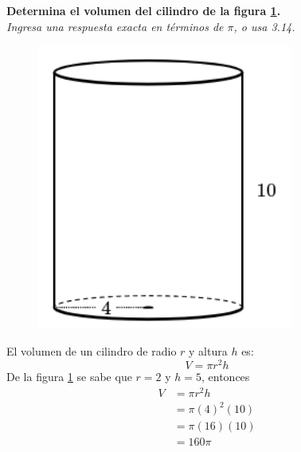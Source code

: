 \question[10] \textbf{Determina el volumen del cilindro de la figura \ref{fig:vol_cil_12}.}\\
\textit{Ingresa una respuesta exacta en términos de $\pi$, o usa 3.14.}

\begin{minipage}{0.3\linewidth}
    \begin{figure}[H]
        \begin{center}
            \includegraphics[width=0.75\textwidth]{../images/vol_cil_12.png}
        \end{center}
        \caption{}
        \label{fig:vol_cil_12}
    \end{figure}
\end{minipage}
\begin{minipage}{0.7\linewidth}
    \begin{solutionbox}{5cm}        El volumen de un cilindro de radio $r$ y altura $h$ es:
        \begin{equation*}
            V = \pi r^2 h
        \end{equation*}
        De la figura \ref{fig:vol_cil_12} se sabe que $r=2$ y $h=5$, entonces
        \begin{equation*}
            \begin{split}
                V & = \pi r^2 h\\
                & = \pi (4)^2 (10)\\
                & = \pi (16) (10)\\
                & = 160\pi
            \end{split}
        \end{equation*}
    \end{solutionbox}
\end{minipage}